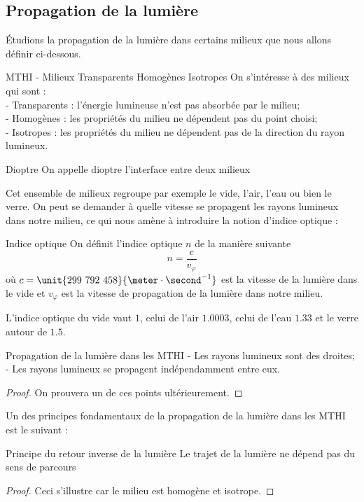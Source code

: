 \documentclass{classe}
\begin{document}
\subsection{Propagation de la lumière}
Étudions la propagation de la lumière dans certains milieux que nous allons définir ci-dessous.
\begin{définition}{MTHI - Milieux Transparents Homogènes Isotropes}{}
On s'intéresse à des milieux qui sont :\\
- Transparents : l'énergie lumineuse n'est pas absorbée par le milieu;\\
- Homogènes : les propriétés du milieu ne dépendent pas du point choisi;\\
- Isotropes : les propriétés du milieu ne dépendent pas de la direction du rayon lumineux.
\end{définition}
\begin{définition}{Dioptre}{}
On appelle dioptre l'interface entre deux milieux
\end{définition}
Cet ensemble de milieux regroupe par exemple le vide, l'air, l'eau ou bien le verre. On peut se demander à quelle vitesse se propagent les rayons lumineux dans notre milieu, ce qui nous amène à introduire la notion d'indice optique :
\begin{définition}{Indice optique}{}
On définit l'indice optique $n$ de la manière suivante
\begin{equation*}
	n=\frac{c}{v_\varphi}
\end{equation*}
où $c =\unit{299~792~458}{\meter\cdot\second^{-1}}$ est la vitesse de la lumière dans le vide et $v_\varphi$ est la vitesse de propagation de la lumière dans notre milieu.
\end{définition}
\begin{example}
	L'indice optique du vide vaut $1$, celui de l'air $1.0003$, celui de l'eau $1.33$ et le verre autour de $1.5$.
\end{example}
\begin{théorème}{Propagation de la lumière dans les MTHI}{}
- Les rayons lumineux sont des droites;\\
- Les rayons lumineux se propagent indépendamment entre eux.
\end{théorème}
\begin{proof}
	On prouvera un de ces points ultérieurement.
\end{proof}
Un des principes fondamentaux de la propagation de la lumière dans les MTHI est le suivant :
\begin{théorème}{Principe du retour inverse de la lumière}{}
Le trajet de la lumière ne dépend pas du sens de parcours
\end{théorème}
\begin{proof}
	Ceci s'illustre car le milieu est homogène et isotrope.
\end{proof}
\end{document}
